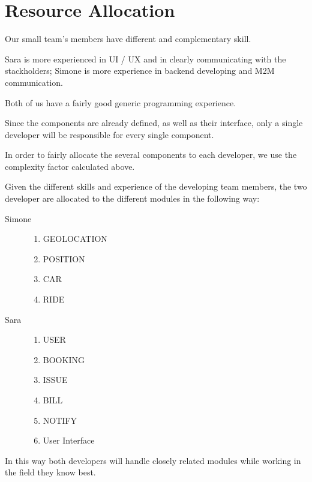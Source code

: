 \documentclass[11pt]{article} %
\begin{document}
\newpage
\section{Resource Allocation}

Our small team's members have different and complementary skill.

Sara is more experienced in UI / UX and in clearly communicating with the stackholders; Simone is more experience in backend developing and M2M communication.

Both of us have a fairly good generic programming experience.

Since the components are already defined, as well as their interface, only a single developer will be responsible for every single component.

In order to fairly allocate the several components to each developer, we use the complexity factor calculated above.

Given the different skills and experience of the developing team members, the two developer are allocated to the different modules in the following way:

\begin{description}
	\item[Simone] \hfill
		\begin{enumerate}
			\item GEOLOCATION
			\item POSITION
			\item CAR
			\item RIDE
		\end{enumerate}
	\item[Sara] \hfill
		\begin{enumerate}
			\item USER
			\item BOOKING
			\item ISSUE
			\item BILL
			\item NOTIFY
			\item User Interface
		\end{enumerate}
\end{description}

In this way both developers will handle closely related modules while working in the field they know best.

\end{document}
